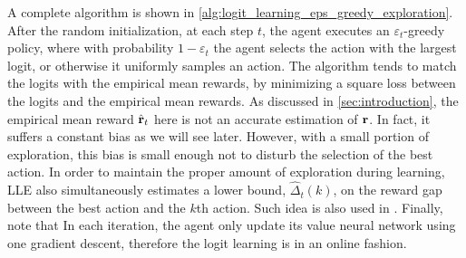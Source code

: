 A complete algorithm is shown in \cref{alg:logit_learning_eps_greedy_exploration}. 
After the random initialization, at each step $t$, the agent executes an $\varepsilon_t$-greedy policy, where with probability $1 - \varepsilon_t$ the agent selects the action with the largest logit, or otherwise it uniformly samples an action.
The algorithm tends to match the logits with the empirical mean rewards, by minimizing a square loss between the logits and the empirical mean rewards.
As discussed in \cref{sec:introduction}, the empirical mean reward $\hat{{\mathbf{r}}}_t$ here is not an accurate estimation of ${\mathbf{r}}$. In fact, it suffers a constant bias as we will see later.
However, with a small portion of exploration, this bias is small enough not to disturb the selection of the best action.
In order to maintain the proper amount of exploration during learning, 
LLE also simultaneously estimates a lower bound, $\hat{\Delta}_t(k)$, on the reward gap between the best action and the $k$th action. 
Such idea is also used in  \cite{seldin2017improved}.
Finally, note that In each iteration, the agent only update its value neural network using one gradient descent, therefore the logit learning is in an online fashion.



